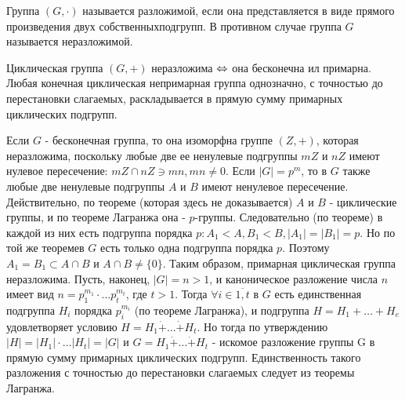 \begin{defs}[Разложимость]
  Группа $(G, \cdot)$ называется разложимой, если она представляется в виде прямого произведения двух собственныхподгрупп.
  В противном случае группа $G$ называется неразложимой.
\end{defs}

\begin{proofs}
	Циклическая группа $(G, +)$ неразложима $\Leftrightarrow$ она бесконечна ил примарна. Любая конечная
  циклическая непримарная группа однозначно, с точностью до перестановки слагаемых, раскладывается в прямую сумму примарных
  циклических подгрупп.
	\begin{dokvo}
    Если $G$ - бесконечная группа, то она изоморфна группе $(Z, +)$, которая неразложима, поскольку
    любые две ее ненулевые подгруппы $mZ$ и $nZ$ имеют нулевое пересечение: $mZ \cap nZ \ni mn, mn \neq 0$.
    Если $|G| = p^m$, то в $G$ также любые две ненулевые подгруппы $A$ и $B$ имеют ненулевое пересечение.
    Действительно, по теореме (которая здесь не доказывается) $A$ и $B$ - циклические группы, и по теореме Лагранжа
    она - $p$-группы. Следовательно (по теореме) в каждой из них есть подгруппа порядка $p: A_1 < A, B_1 < B,
    |A_1| = |B_1| = p$. Но по той же теоремев $G$ есть только одна подгруппа порядка $p$. Поэтому $A_1 = B_1 \subset A \cap B$ и
    $A \cap B \neq \{0\}$. Таким образом, примарная циклическая группа неразложима.
    Пусть, наконец, $|G| = n > 1$, и каноническое разложение числа $n$ имеет вид $n = p_1^{m_1} \cdot \ldots p_t^{m_t}$, где
    $t > 1$. Тогда $\forall i \in \overline{1,t}$ в $G$ есть единственная подгруппа $H_i$ порядка $p_i^{m_i}$ (по теореме Лагранжа),
    и подгруппа $H = H_1 + \ldots + H_{e}$ удовлетворяет условию $H = H_1 \dot{+} \ldots \dot{+} H_t$. Но тогда по утверждению
    $|H| = |H_1| \cdot \ldots |H_t| = |G|$ и $G = H_1 \dot{+} \ldots \dot{+} H_t$ - искомое разложение группы G в прямую сумму примарных циклических подгрупп.
    Единственность такого разложения с точностью до перестановки слагаемых следует из теоремы Лагранжа.

	\end{dokvo}
\end{proofs}
